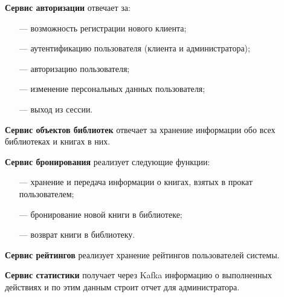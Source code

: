 \documentclass[a4paper, 12pt]{article}
\begin{document}
\begin{large}
\textbf{Сервис авторизации} отвечает за:
\begin{itemize}
	\item[---] возможность регистрации нового клиента;
	
	\item[---] аутентификацию пользователя (клиента и администратора);
	
	\item[---] авторизацию пользователя;
	
	\item[---] изменение персональных данных пользователя;
	
	\item[---] выход из сессии.
\end{itemize}

\textbf{Сервис объектов библиотек} отвечает за хранение информации обо всех библиотеках и книгах в них. 

\textbf{Сервис бронирования} реализует следующие функции:
\begin{itemize}
	\item[---] хранение и передача информации о книгах, взятых в прокат пользователем;
	
	\item[---] бронирование новой книги в библиотеке;
	
	\item[---] возврат книги в библиотеку.
\end{itemize}

\textbf{Сервис рейтингов} реализует хранение рейтингов пользователей системы.

\textbf{Сервис статистики} получает через Kafka информацию о выполненных действиях и по этим данным строит отчет для администратора.



\end{large}
\end{document}
